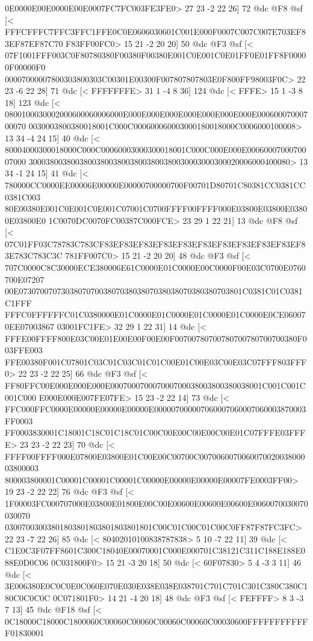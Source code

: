 {{{{{{{{{{{{{{{{{{{{{{{{{{{{{{{{{{{{{{{{{{{{{{{{{{{{{{{{{{{{{{{{{{{{{{{{{{{{{{{{{{{{{{{{{{{{{{{{{{{{{0E0000E00E0000E00E0007FC7FC003FE3FE0>
	 27 23 -2 22 26] 72 @dc
@F8 @sf
[<
FFFCFFFC7FFC3FFC1FFE0C0E0606030601C001E000F0007C007C007E703EF83EF87EF87C70
F83FF00FC0>
	 15 21 -2 20 20] 50 @dc
@F3 @sf
[<
07F1001FFF003C0F80780380F00380F00380E001C0E001C0E01FF0E01FF8F00000F00000F0
00007000007800303800303C00301E00300F007807807803E0F800FF98003F0C>
	 22 23 -6 22 28] 71 @dc
[<
FFFFFFFE>
	 31 1 -4 8 36] 124 @dc
[<
FFFE>
	 15 1 -3 8 18] 123 @dc
[<
0800100030002000600060006000E000E000E000E000E000E000E000E00060007000700070
0030003800380018001C000C000600060003000180018000C0006000100008>
	 13 34 -4 24 15] 40 @dc
[<
80004000300018000C000C00060003000300018001C000C000E000E0006000700070007000
30003800380038003800380038003800380030003000300020006000400080>
	 13 34 -1 24 15] 41 @dc
[<
780000CC0000EE00006E00000E00000700000700F00701D80701C80381CC0381CC0381C003
80E00380E001C0E001C0E001C07001C0700FFFF00FFFF000E03800E03800E03800E03800E0
1C0070DC0070FC00387C000FCE>
	 23 29 1 22 21] 13 @dc
@F8 @sf
[<
07C01FF03C78783C783CF83EF83EF83EF83EF83EF83EF83EF83EF83EF83EF83E783C783C3C
781FF007C0>
	 15 21 -2 20 20] 48 @dc
@F3 @sf
[<
707C0000C8C30000ECE380006E61C0000E01C0000E00C0000F00E03C0700E0760700E07207
00E07307007073038070700380703803807038038070380380703801C0381C01C0381C1FFF
FFFC0FFFFFFC01C0380000E01C0000E01C0000E01C0000E01C0000E0CE060070EE07003867
03001FC1FE>
	 32 29 1 22 31] 14 @dc
[<
FFFE00FFFF800E03C00E01E00E00F00E00F00700780700780700780700700380F003FFE003
FFE00380F001C07801C03C01C03C01C01C00E01C00E03C00E03C07FFF803FFF0>
	 22 23 -2 22 25] 66 @dc
@F3 @sf
[<
FF80FFC00E000E000E000E000700070007000700038003800380038001C001C001C001C000
E000E000E007FE07FE>
	 15 23 -2 22 14] 73 @dc
[<
FFC000FFC0000E00000E00000E00000E000007000007060007060007060003870003FF0003
FF0003830001C18001C18C01C18C01C00C00E00C00E00C00E01C07FFFE03FFFE>
	 23 23 -2 22 23] 70 @dc
[<
FFFF00FFFF000E07800E03800E01C00E00C00700C007006007006007002003800003800003
800003800001C00001C00001C00001C00000E00000E00000E00007FE0003FF00>
	 19 23 -2 22 22] 76 @dc
@F3 @sf
[<
1F00003FC000707000E03800E01800E00C00E00600E00600E00600E0060070030070030070
03007003003801803801803801803801801C00C01C00C01C00C0FF87F87FC3FC>
	 22 23 -7 22 26] 85 @dc
[<
80402010100838787838>
	 5 10 -7 22 11] 39 @dc
[<
C1E0C3F07FF8601C300C18040E00070001C000E000701C38121C311C188E188E088E0D0C06
0C031800F0>
	 15 21 -3 20 18] 50 @dc
[<
60F07830>
	 5 4 -3 3 11] 46 @dc
[<
3E006380E0C0C0E0C060E070E030E038E038E038701C701C701C301C380C380C180C0C0C0C
0C071801F0>
	 14 21 -4 20 18] 48 @dc
@F3 @sf
[<
FEFFFF>
	 8 3 -3 7 13] 45 @dc
@F18 @sf
[<
0C18000C18000C1800060C00060C00060C00060C00060C00030600FFFFFFFFFFFF01830001
}}}}}}}}}}}}}}}}}}}}}}}}}}}}}}}}}}}}}}}}}}}}}}}}}}}}}}}}}}}}}}}}}}}}}}}}}}}}}}}}}}}}}}}}}}}}}}}}}}}}}
